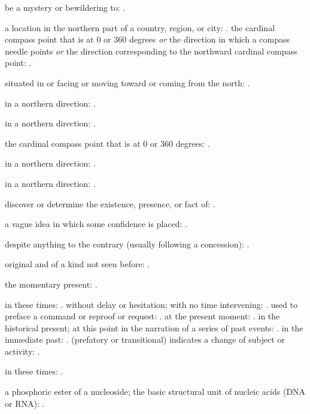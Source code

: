   be a mystery or bewildering to: .

  a location in the northern part of a country, region, or city: . the cardinal compass point that is at 0 or 360 degrees \textit{or} the direction in which a compass needle points \textit{or} the direction corresponding to the northward cardinal compass point: .

  situated in or facing or moving toward or coming from the north: .

  in a northern direction: .

  in a northern direction: .

  the cardinal compass point that is at 0 or 360 degrees: .

  in a northern direction: .

  in a northern direction: .

  discover or determine the existence, presence, or fact of: .

  a vague idea in which some confidence is placed: .

  despite anything to the contrary (usually following a concession): .

  original and of a kind not seen before: .

  the momentary present: .

  in these times: . without delay or hesitation; with no time intervening: . used to preface a command or reproof or request: . at the present moment: . in the historical present; at this point in the narration of a series of past events: . in the immediate past: . (prefatory or transitional) indicates a change of subject or activity: .

  in these times: .

  a phosphoric ester of a nucleoside; the basic structural unit of nucleic acids (DNA or RNA): .

